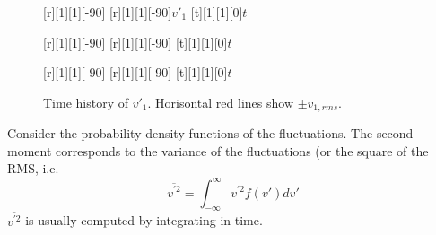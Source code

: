\begin{figure}[bt]
\centering
\begin{minipage}[b]{0.33\textwidth}
[r][1][1][-90]{}
[r][1][1][-90]{$v'_1$}
[t][1][1][0]{$t$}
\end{minipage}%
\begin{minipage}[b]{0.33\textwidth}
[r][1][1][-90]{}
[r][1][1][-90]{}
[t][1][1][0]{$t$}
\end{minipage}%
\begin{minipage}[b]{0.33\textwidth}
[r][1][1][-90]{}
[r][1][1][-90]{}
[t][1][1][0]{$t$}
\end{minipage}%
\caption{Time history of $v'_1$. Horisontal red lines show $\pm v_{1,rms}$.}
\label{time-hist}
\end{figure}


Consider the  probability density functions of the fluctuations. 
The second moment corresponds to the variance of the fluctuations (or the square of the RMS, i.e.
%
\begin{equation*}
\overline{v^{\prime 2}}= \int_{-\infty}^\infty v^{\prime 2} f(v') dv'
\end{equation*}
%
$\overline{v^{\prime 2}}$ is usually computed by integrating in time.



